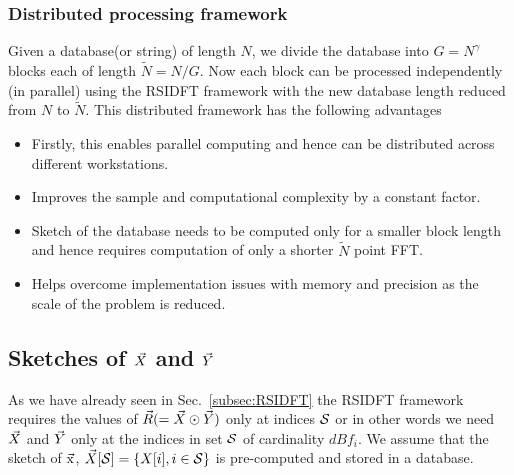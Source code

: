 \subsubsection{Distributed processing framework}
Given a database(or string) of length $N$, we divide the database into $G=N^\gamma$ blocks each of length $\tilde{N} = N/G$. Now each block can be processed independently (in parallel) using the RSIDFT framework with the new database length reduced from $N$ to $\tilde{N}$. This distributed framework has the following advantages
\begin{itemize}
	\item Firstly, this enables parallel computing and hence can be distributed across different workstations.
	\item Improves the sample and computational complexity by a constant factor.
	\item Sketch of the database needs to be computed only for a smaller block length and hence requires computation of only a shorter $\tilde{N}$ point FFT.
	\item Helps overcome implementation issues with memory and precision as the scale of the problem is reduced. 
\end{itemize}
\subsection{Sketches of $\vec{X}$ and $\vec{Y}$}
\label{subsec:skteches}		
 As we have already seen in Sec.~\ref{subsec:RSIDFT} the RSIDFT framework requires the values of $\vec{R}(=\vec{X}\odot \vec{Y})$ only at indices $\mathcal{S}$ or in other words we need $\vec{X}$ and $\vec{Y}$ only at the indices in set $\mathcal{S}$ of cardinality $dBf_i$. We assume that the sketch of $\vec{\mathrm{x}}$, $ \vec{X}[\mathcal{S}]= \{X[i],i\in \mathcal{S}\}$ is pre-computed and stored in a database.

